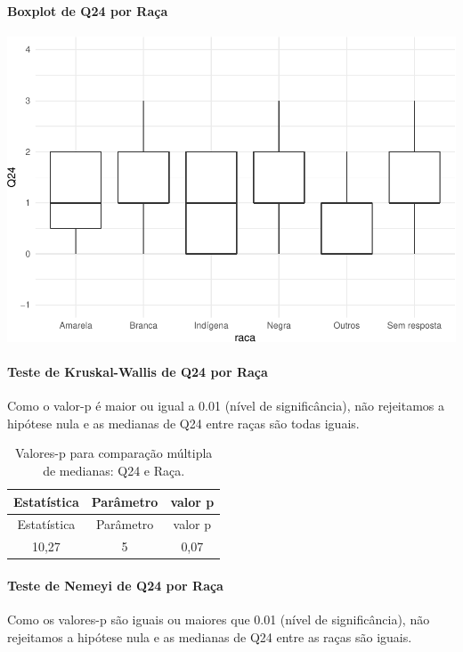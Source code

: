 \documentclass[]{article}
\let\oldparagraph\paragraph
\renewcommand{\paragraph}[1]{\oldparagraph{#1}\mbox{}}
\begin{document}
\hypertarget{boxplot-de-q24-por-rauxe7a}{%
\paragraph{Boxplot de Q24 por Raça}\label{boxplot-de-q24-por-rauxe7a}}

\begin{center}\includegraphics[width=0.75\linewidth]{relatorio_covid19_files/figure-latex/unnamed-chunk-637-1} \end{center}

\hypertarget{teste-de-kruskal-wallis-de-q24-por-rauxe7a}{%
\paragraph{Teste de Kruskal-Wallis de Q24 por Raça}\label{teste-de-kruskal-wallis-de-q24-por-rauxe7a}}

Como o valor-p é maior ou igual a 0.01 (nível de significância), não rejeitamos a hipótese nula e as medianas de Q24 entre raças são todas iguais.

\begin{longtable}[]{@{}ccc@{}}
\caption{\label{tab:unnamed-chunk-639}Valores-p para comparação múltipla de medianas: Q24 e Raça.}\tabularnewline
\toprule
Estatística & Parâmetro & valor p\tabularnewline
\midrule
\endfirsthead
\toprule
Estatística & Parâmetro & valor p\tabularnewline
\midrule
\endhead
10,27 & 5 & 0,07\tabularnewline
\bottomrule
\end{longtable}

\hypertarget{teste-de-nemeyi-de-q24-por-rauxe7a}{%
\paragraph{Teste de Nemeyi de Q24 por Raça}\label{teste-de-nemeyi-de-q24-por-rauxe7a}}

Como os valores-p são iguais ou maiores que 0.01 (nível de significância), não rejeitamos a hipótese nula e as medianas de Q24 entre as raças são iguais.
\end{document}
